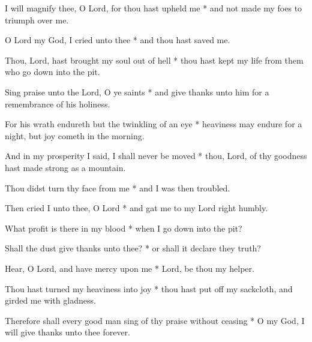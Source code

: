I will magnify thee, O Lord, for thou hast upheld me * and not made my foes to triumph over me.

O Lord my God, I cried unto thee * and thou hast saved me.

Thou, Lord, hast brought my soul out of hell * thou hast kept my life from them who go down into the pit.

Sing praise unto the Lord, O ye saints * and give thanks unto him for a remembrance of his holiness.

For his wrath endureth but the twinkling of an eye * heaviness may endure for a night, but joy cometh in the morning.

And in my prosperity I said, I shall never be moved * thou, Lord, of thy goodness hast made strong as a mountain.

Thou didst turn thy face from me * and I was then troubled.

Then cried I unto thee, O Lord * and gat me to my Lord right humbly.

What profit is there in my blood * when I go down into the pit?

Shall the dust give thanks unto thee? * or shall it declare they truth?

Hear, O Lord, and have mercy upon me * Lord, be thou my helper.

Thou hast turned my heaviness into joy * thou hast put off my sackcloth, and girded me with gladness.

Therefore shall every good man sing of thy praise without ceasing * O my God, I will give thanks unto thee forever.